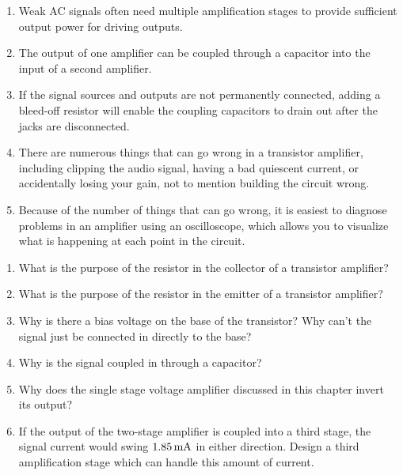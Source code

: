 \begin{enumerate}
\item Weak AC signals often need multiple amplification stages to provide sufficient output power for driving outputs.
\item The output of one amplifier can be coupled through a capacitor into the input of a second amplifier.
\item If the signal sources and outputs are not permanently connected, adding a bleed-off resistor will enable the coupling capacitors to drain out after the jacks are disconnected.
\item There are numerous things that can go wrong in a transistor amplifier, including clipping the audio signal, having a bad quiescent current, or accidentally losing your gain, not to mention building the circuit wrong.
\item Because of the number of things that can go wrong, it is easiest to diagnose problems in an amplifier using an oscilloscope, which allows you to visualize what is happening at each point in the circuit.
\end{enumerate}

\applysection
\begin{enumerate}
\item What is the purpose of the resistor in the collector of a transistor amplifier?
\item What is the purpose of the resistor in the emitter of a transistor amplifier?
\item Why is there a bias voltage on the base of the transistor?  Why can't the signal just be connected in directly to the base?
\item Why is the signal coupled in through a capacitor?
\item Why does the single stage voltage amplifier discussed in this chapter invert its output?
\item If the output of the two-stage amplifier is coupled into a third stage, the signal current would swing $1.85\,\si{\milli\ampere}$ in either direction.  Design a third amplification stage which can handle this amount of current.
\end{enumerate}
